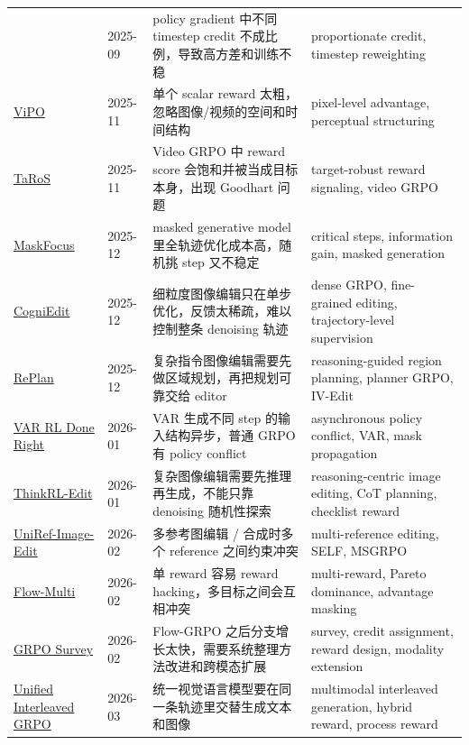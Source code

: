 {\begin{longtable}{p{2.7cm}p{2.1cm}p{4.2cm}p{4.2cm}}
&
2025-09
&
policy gradient 中不同 timestep credit 不成比例，导致高方差和训练不稳
&
proportionate credit, timestep reweighting
\\
\href{https://arxiv.org/abs/2511.18719}{ViPO}
&
2025-11
&
单个 scalar reward 太粗，忽略图像/视频的空间和时间结构
&
pixel-level advantage, perceptual structuring
\\
\href{https://arxiv.org/abs/2511.19356}{TaRoS}
&
2025-11
&
Video GRPO 中 reward score 会饱和并被当成目标本身，出现 Goodhart 问题
&
target-robust reward signaling, video GRPO
\\
\href{https://arxiv.org/abs/2512.18766}{MaskFocus}
&
2025-12
&
masked generative model 里全轨迹优化成本高，随机挑 step 又不稳定
&
critical steps, information gain, masked generation
\\
\href{https://arxiv.org/abs/2512.13276}{CogniEdit}
&
2025-12
&
细粒度图像编辑只在单步优化，反馈太稀疏，难以控制整条 denoising 轨迹
&
dense GRPO, fine-grained editing, trajectory-level supervision
\\
\href{https://arxiv.org/abs/2512.16864}{RePlan}
&
2025-12
&
复杂指令图像编辑需要先做区域规划，再把规划可靠交给 editor
&
reasoning-guided region planning, planner GRPO, IV-Edit
\\
\href{https://arxiv.org/abs/2601.02256}{VAR RL Done Right}
&
2026-01
&
VAR 生成不同 step 的输入结构异步，普通 GRPO 有 policy conflict
&
asynchronous policy conflict, VAR, mask propagation
\\
\href{https://arxiv.org/abs/2601.03467}{ThinkRL-Edit}
&
2026-01
&
复杂图像编辑需要先推理再生成，不能只靠 denoising 随机性探索
&
reasoning-centric image editing, CoT planning, checklist reward
\\
\href{https://arxiv.org/abs/2602.14186}{UniRef-Image-Edit}
&
2026-02
&
多参考图编辑 / 合成时多个 reference 之间约束冲突
&
multi-reference editing, SELF, MSGRPO
\\
\href{https://www.mdpi.com/1424-8220/26/4/1120}{Flow-Multi}
&
2026-02
&
单 reward 容易 reward hacking，多目标之间会互相冲突
&
multi-reward, Pareto dominance, advantage masking
\\
\href{https://arxiv.org/abs/2603.06623}{GRPO Survey}
&
2026-02
&
Flow-GRPO 之后分支增长太快，需要系统整理方法改进和跨模态扩展
&
survey, credit assignment, reward design, modality extension
\\
\href{https://arxiv.org/abs/2603.09538}{Unified Interleaved GRPO}
&
2026-03
&
统一视觉语言模型要在同一条轨迹里交替生成文本和图像
&
multimodal interleaved generation, hybrid reward, process reward
\\

\end{longtable}}
